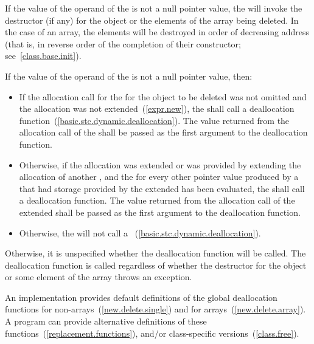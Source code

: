 \pnum
{}%
If the value of the operand of the  is not a
null pointer value, the  will invoke the
destructor (if any) for the object or the elements of the array being
deleted. In the case of an array, the elements will be destroyed in
order of decreasing address (that is, in reverse order of the completion
of their constructor; see~\ref{class.base.init}).

\pnum
If the value of the operand of the  is not a
null pointer value, then:

\begin{itemize}
\item
If the allocation call for the  for the object to
be deleted was not omitted and the allocation was not extended~(\ref{expr.new}), the
 shall call a deallocation
function~(\ref{basic.stc.dynamic.deallocation}). The value returned from the
allocation call of the  shall be passed as the
first argument to the deallocation function.

\item
Otherwise, if the allocation was extended or was provided by extending the
allocation of another , and the
 for every other pointer value produced by a
 that had storage provided by the extended
 has been evaluated, the
 shall call a deallocation function. The value
returned from the allocation call of the extended 
shall be passed as the first argument to the deallocation function.

\item
Otherwise, the  will not call a
%
%
%
~(\ref{basic.stc.dynamic.deallocation}).
\end{itemize}

Otherwise, it is unspecified whether the deallocation function will be
called.
\enternote
The deallocation function is called regardless of whether the destructor
for the object or some element of the array throws an exception.
\exitnote

\pnum
\enternote 
An implementation provides default definitions of the global
deallocation functions  for
non-arrays~(\ref{new.delete.single}) and
%
%
 for arrays~(\ref{new.delete.array}). A \Cpp
program can provide alternative definitions of these
functions~(\ref{replacement.functions}), and/or class-specific
versions~(\ref{class.free}).
\exitnote 

